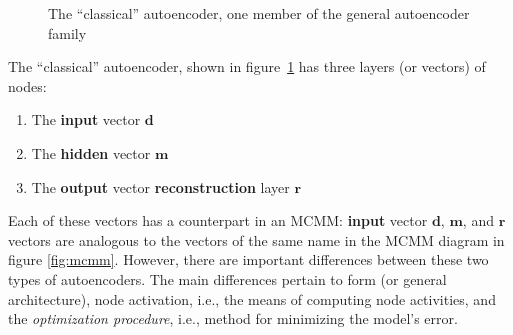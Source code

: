 \begin{figure}[tb]
\begin{center}
\end{center}
\caption{The ``classical'' autoencoder, one member of the general autoencoder family}
\label{fig:autoencoder}
\end{figure}

 The ``classical'' autoencoder,
shown in figure~\ref{fig:autoencoder} has three layers (or vectors) of nodes:
\begin{enumerate}
\item The \textbf{input} vector $\textbf{d}$
\item The \textbf{hidden} vector $\textbf{m}$
\item The \textbf{output} vector \textbf{reconstruction} layer $\textbf{r}$ 
\end{enumerate}

 Each of these vectors has a counterpart in an MCMM: \textbf{input} vector $\textbf{d}$, $\textbf{m}$, and $\textbf{r}$ vectors are analogous to the vectors of the same name in the MCMM diagram in figure \ref{fig:mcmm}.
However, there are important differences between these two types of autoencoders. The main differences pertain to form (or general architecture), node activation, i.e., the means of computing node activities, and the \emph{optimization procedure}, i.e., method for  minimizing the model's error.

